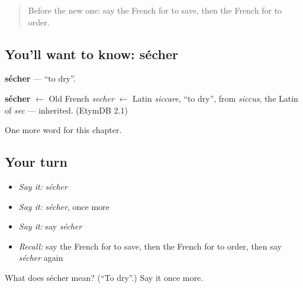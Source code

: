\begin{quote}
Before the new one: say the French for to save, then the French for to order.
\end{quote}

\subsection*{You'll want to know: sécher}
\textbf{sécher} — \textquotedblleft{}to dry\textquotedblright{}.

\begin{cousinweb}
\textbf{sécher} $\leftarrow$ Old French \emph{secher} $\leftarrow$ Latin \emph{siccare}, \textquotedblleft{}to dry\textquotedblright{}, from \emph{siccus}, the Latin of \emph{sec} — inherited. (EtymDB 2.1)
\end{cousinweb}

\begin{grammarlens}[title={What you've built}]
One more word for this chapter.
\end{grammarlens}

\subsection*{Your turn}
\begin{itemize}
\raggedright
  \item \emph{Say it:} \emph{sécher}
  \item \emph{Say it:} \emph{sécher}, once more
  \item \emph{Say it:} say \emph{sécher}
  \item \emph{Recall:} say the French for to save, then the French for to order, then say \emph{sécher} again
\end{itemize}

\begin{tcolorbox}[breakable,colback=teal!4,colframe=teal!35!black,title={Before you move on}]
What does sécher mean? (\textquotedblleft{}To dry\textquotedblright{}.) Say it once more.
\end{tcolorbox}
